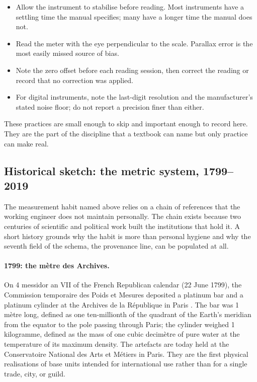 \begin{itemize}[leftmargin=*]
  \item Allow the instrument to stabilise before reading. Most
    instruments have a settling time the manual specifies; many have
    a longer time the manual does not.
  \item Read the meter with the eye perpendicular to the scale.
    Parallax error is the most easily missed source of bias.
  \item Note the zero offset before each reading session, then
    correct the reading or record that no correction was applied.
  \item For digital instruments, note the last-digit resolution and
    the manufacturer's stated noise floor; do not report a precision
    finer than either.
\end{itemize}

These practices are small enough to skip and important enough to
record here. They are the part of the discipline that a textbook can
name but only practice can make real.

\subsection{Historical sketch: the metric system, 1799--2019}

The measurement habit named above relies on a chain of references
that the working engineer does not maintain personally. The chain
exists because two centuries of scientific and political work built
the institutions that hold it. A short history grounds why the habit
is more than personal hygiene and why the seventh field of the
schema, the provenance line, can be populated at all.

\paragraph{1799: the m\`etre des Archives.}

On 4 messidor an VII of the French Republican calendar (22 June
1799), the Commission temporaire des Poids et Mesures deposited a
platinum bar and a platinum cylinder at the Archives de la
R\'epublique in Paris \cite{hist:ch01t3-archives-metre-1799}. The bar
was 1 m\`etre long, defined as one ten-millionth of the quadrant of
the Earth's meridian from the equator to the pole passing through
Paris; the cylinder weighed 1 kilogramme, defined as the mass of one
cubic decim\`etre of pure water at the temperature of its maximum
density. The artefacts are today held at the Conservatoire National
des Arts et M\'etiers in Paris. They are the first physical
realisations of base units intended for international use rather
than for a single trade, city, or guild.

